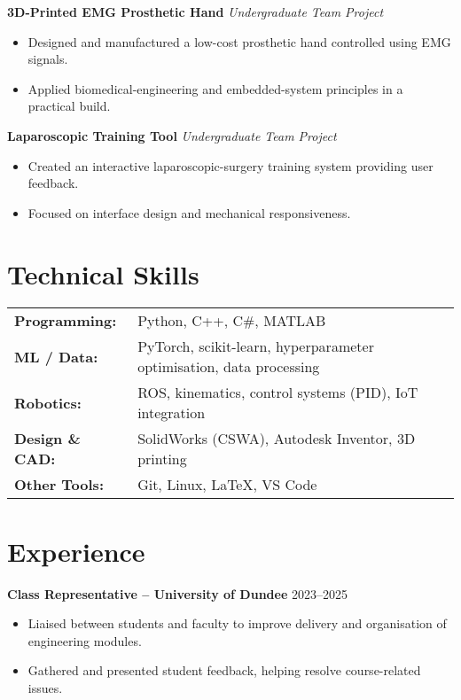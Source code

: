 \documentclass[a4paper,11pt]{article}
\begin{document}
\textbf{3D-Printed EMG Prosthetic Hand} \hfill \textit{Undergraduate Team Project}
\begin{itemize}
    \item Designed and manufactured a low-cost prosthetic hand controlled using EMG signals.
    \item Applied biomedical-engineering and embedded-system principles in a practical build.
\end{itemize}

\textbf{Laparoscopic Training Tool} \hfill \textit{Undergraduate Team Project}
\begin{itemize}
    \item Created an interactive laparoscopic-surgery training system providing user feedback.
    \item Focused on interface design and mechanical responsiveness.
\end{itemize}


\section*{Technical Skills}

\begin{tabular}{@{}ll}
\textbf{Programming:} & Python, C++, C\#, MATLAB \\
\textbf{ML / Data:} & PyTorch, scikit-learn, hyperparameter optimisation, data processing \\
\textbf{Robotics:} & ROS, kinematics, control systems (PID), IoT integration \\
\textbf{Design \& CAD:} & SolidWorks (CSWA), Autodesk Inventor, 3D printing \\
\textbf{Other Tools:} & Git, Linux, LaTeX, VS Code
\end{tabular}

\section*{Experience}

\textbf{Class Representative – University of Dundee} \hfill 2023--2025
\begin{itemize}
    \item Liaised between students and faculty to improve delivery and organisation of engineering modules.
    \item Gathered and presented student feedback, helping resolve course-related issues.
\end{itemize}
\end{document}
